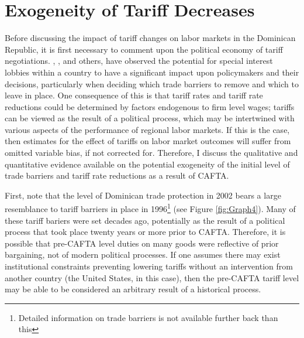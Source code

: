 \documentclass[12pt]{article}
\begin{document}
\section{Exogeneity of Tariff Decreases}
\label{sec:Exogeneity}
Before discussing the impact of tariff changes on labor markets in
the Dominican Republic, it is first necessary to comment upon the political economy of
tariff negotiations. \citet{grossman}, \citet{brock1978}, \citet{maggi2007political} and others, 
have observed the potential for special interest lobbies within a country to have a significant 
impact upon policymakers and their decisions, particularly when deciding which trade barriers to 
remove and which to leave in place. One consequence of this is that 
tariff rates and tariff rate reductions could be determined by factors endogenous to firm level
wages; tariffs can be viewed as the result of a political process, which may be intertwined with 
various aspects of the performance of regional labor markets. If this is the case, then estimates 
for the effect of tariffs on labor market outcomes will suffer from omitted variable bias, if not
corrected for. Therefore, I discuss the qualitative and
quantitative evidence available on the potential exogeneity of the initial level of
trade barriers and tariff rate reductions as a result of CAFTA. 

First, note that the level of Dominican trade protection in 2002 bears a large resemblance
to tariff barriers in place in 1996\footnote{Detailed
information on trade barriers is not available further back than this} (see Figure \ref{fig:Graph4}).
Many of these tariff bariers were set decades ago, potentially as the result of a political process
that took place twenty years or more prior to CAFTA. Therefore, it is possible that pre-CAFTA level 
duties on many goods were reflective of prior bargaining, not of modern political processes.
If one assumes there may exist institutional constraints preventing lowering tariffs without an 
intervention from another country (the United States, in this case), then the pre-CAFTA tariff
level may be able to be considered an arbitrary result of a historical process. 
\end{document}
